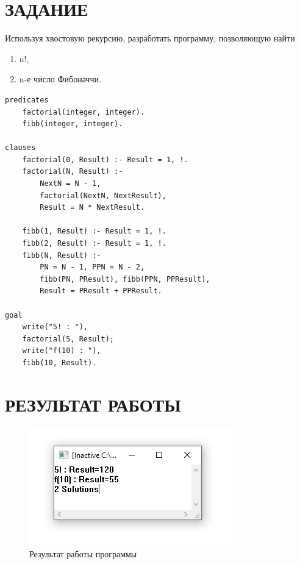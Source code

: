 \section{ЗАДАНИЕ}

Используя хвостовую рекурсию, разработать программу, позволяющую найти 

\begin{enumerate}
    \item n!,
    \item n-е число Фибоначчи.
\end{enumerate}

\begin{lstlisting}[caption=Текст программы]
predicates
	factorial(integer, integer).
	fibb(integer, integer).

clauses
	factorial(0, Result) :- Result = 1, !.
	factorial(N, Result) :-
		NextN = N - 1,
		factorial(NextN, NextResult),
		Result = N * NextResult.

	fibb(1, Result) :- Result = 1, !.
	fibb(2, Result) :- Result = 1, !.
	fibb(N, Result) :-
		PN = N - 1, PPN = N - 2,
		fibb(PN, PResult), fibb(PPN, PPResult),
		Result = PResult + PPResult.

goal
	write("5! : "),
	factorial(5, Result);
	write("f(10) : "),
	fibb(10, Result).
\end{lstlisting}

\section{РЕЗУЛЬТАТ РАБОТЫ}

\begin{figure}[H]
    \centering
    \includegraphics{img/result.png}
    \caption{Результат работы программы}
\end{figure}

